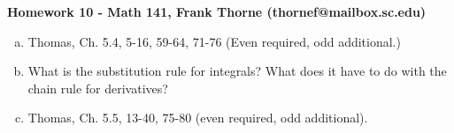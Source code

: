 \documentclass[12pt]{article}
\begin{document}
\setlength{\topmargin}{-2mm}





\begin{center}{\bf Homework 10 - Math 141, Frank Thorne (thornef@mailbox.sc.edu)}
\end{center}

\begin{enumerate}[(a)]

\item
Thomas, Ch. 5.4, 5-16, 59-64, 71-76 (Even required, odd additional.)

\item
What is the substitution rule for integrals? What does it have to do with the chain rule
for derivatives?

\item
Thomas, Ch. 5.5, 13-40, 75-80 (even required, odd additional).

\end{enumerate}
\end{document}
